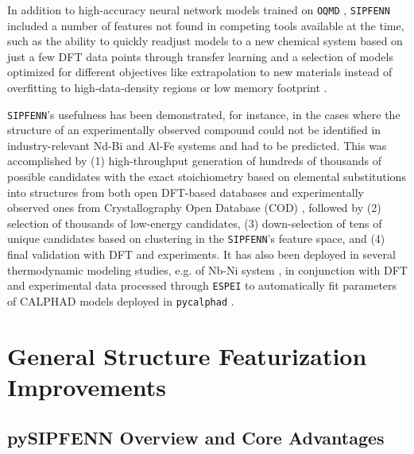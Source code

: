 In addition to high-accuracy neural network models trained on \texttt{OQMD} \cite{Saal2013MaterialsOQMD, Kirklin2015TheEnergies, Shen2022ReflectionsOQMD}, \texttt{SIPFENN} included a number of features not found in competing tools available at the time, such as the ability to quickly readjust models to a new chemical system based on just a few DFT data points through transfer learning and a selection of models optimized for different objectives like extrapolation to new materials instead of overfitting to high-data-density regions or low memory footprint \cite{Krajewski2022ExtensibleNetworks}.

\texttt{SIPFENN}'s usefulness has been demonstrated, for instance, in the cases where the structure of an experimentally observed compound could not be identified in industry-relevant Nd-Bi \cite{Im2022ThermodynamicModeling} and Al-Fe \cite{Shang2021FormingJoints} systems and had to be predicted. This was accomplished by (1) high-throughput generation of hundreds of thousands of possible candidates with the exact stoichiometry based on elemental substitutions into structures from both open DFT-based databases \cite{Saal2013MaterialsOQMD, Kirklin2015TheEnergies, Shen2022ReflectionsOQMD, Curtarolo2013AFLOW:Discovery, Toher2018TheDiscovery, Jain2013Commentary:Innovation, Choudhary2020TheDesign, Schmidt2022AFunctionals, Merchant2023ScalingDiscovery} and experimentally observed ones from Crystallography Open Database (COD) \cite{Grazulis2009CrystallographyStructures, Grazulis2012CrystallographyCollaboration, Grazulis2019CrystallographyPerspectives}, followed by (2) selection of thousands of low-energy candidates, (3) down-selection of tens of unique candidates based on clustering in the \texttt{SIPFENN}'s feature space, and (4) final validation with DFT and experiments. It has also been deployed in several thermodynamic modeling studies, e.g. of Nb-Ni system \cite{Sun2023ThermodynamicESPEI}, in conjunction with DFT and experimental data processed through \texttt{ESPEI} \cite{Bocklund2019ESPEICuMg} to automatically fit parameters of CALPHAD \cite{Olson2023GenomicDynamics} models deployed in \texttt{pycalphad} \cite{Otis2017Pycalphad:Python}.


\section{General Structure Featurization Improvements} \label{pysipfenn:sec:featurization}

\subsection{pySIPFENN Overview and Core Advantages} \label{pysipfenn:ssec:coreimprovements}

